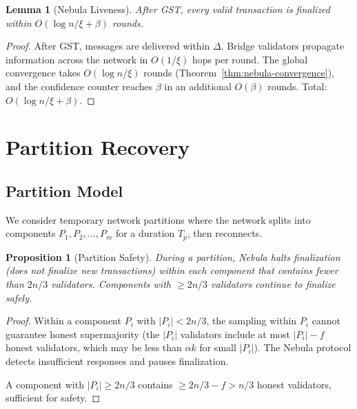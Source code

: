 \documentclass[11pt,a4paper]{article}
\newtheorem{lemma}[theorem]{Lemma}
\newtheorem{proposition}[theorem]{Proposition}
\begin{document}
\begin{lemma}[Nebula Liveness]
\label{lem:nebula-liveness}
After GST, every valid transaction is finalized within $O(\log n / \xi + \beta)$ rounds.
\end{lemma}

\begin{proof}
After GST, messages are delivered within $\Delta$. Bridge validators propagate
information across the network in $O(1/\xi)$ hops per round. The global convergence
takes $O(\log n / \xi)$ rounds (Theorem~\ref{thm:nebula-convergence}), and the
confidence counter reaches $\beta$ in an additional $O(\beta)$ rounds. Total:
$O(\log n / \xi + \beta)$.
\end{proof}

\section{Partition Recovery}
\label{sec:partition}

\subsection{Partition Model}

We consider temporary network partitions where the network splits into components
$P_1, P_2, \ldots, P_m$ for a duration $T_p$, then reconnects.

\begin{proposition}[Partition Safety]
\label{prop:partition}
During a partition, Nebula halts finalization (does not finalize new transactions)
within each component that contains fewer than $2n/3$ validators. Components with
$\geq 2n/3$ validators continue to finalize safely.
\end{proposition}

\begin{proof}
Within a component $P_i$ with $|P_i| < 2n/3$, the sampling within $P_i$ cannot
guarantee honest supermajority (the $|P_i|$ validators include at most $|P_i| - f$
honest validators, which may be less than $\alpha k$ for small $|P_i|$). The Nebula
protocol detects insufficient responses and pauses finalization.

A component with $|P_i| \geq 2n/3$ contains $\geq 2n/3 - f > n/3$ honest validators,
sufficient for safety.
\end{proof}
\end{document}
